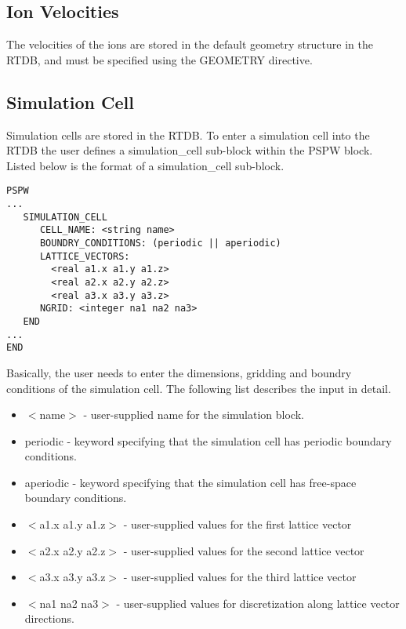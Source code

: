 \subsection{Ion Velocities}
The velocities of the ions are stored in the default geometry structure
in the RTDB, and must be specified using the GEOMETRY directive.

\subsection{Simulation Cell}
\label{sec:pspw_cell}
Simulation cells are stored in the RTDB.  To enter a  simulation cell
into the RTDB the user defines a simulation\_cell sub-block within the PSPW 
block.  Listed below is the format of a simulation\_cell sub-block.
\begin{verbatim}
PSPW
...
   SIMULATION_CELL
      CELL_NAME: <string name>
      BOUNDRY_CONDITIONS: (periodic || aperiodic)
      LATTICE_VECTORS:
        <real a1.x a1.y a1.z>
        <real a2.x a2.y a2.z>
        <real a3.x a3.y a3.z>
      NGRID: <integer na1 na2 na3>
   END
...
END
\end{verbatim}
Basically, the user needs to enter the dimensions, gridding and boundry
conditions of the simulation cell.  The following list describes the 
input in detail.
\begin{itemize}
        \item $<$name$>$ - user-supplied name for the simulation block.
        \item periodic - keyword specifying that the simulation cell 
                         has periodic boundary conditions.      
        \item aperiodic - keyword specifying that the simulation cell
                          has free-space boundary conditions. 
        \item $<$a1.x a1.y a1.z$>$ - user-supplied values for the first 
                                   lattice vector 
        \item $<$a2.x a2.y a2.z$>$ - user-supplied values for the second 
                                   lattice vector
        \item $<$a3.x a3.y a3.z$>$ - user-supplied values for the third 
                                   lattice vector
        \item $<$na1 na2 na3$>$ - user-supplied values for discretization 
                                along lattice vector directions.
\end{itemize}

